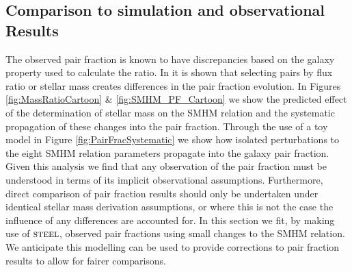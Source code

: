\subsection{Comparison to simulation and observational Results}
\label{subsec:SimObsRes}
The observed pair fraction is known to have discrepancies based on the galaxy property used to calculate the ratio. In \citet{Man2016RESOLVING03} it is shown that selecting pairs by flux ratio or stellar mass creates differences in the pair fraction evolution. 
In Figures \ref{fig:MassRatioCartoon} \& \ref{fig:SMHM_PF_Cartoon} we show the predicted effect of the determination of stellar mass on the SMHM relation and the systematic propagation of these changes into the pair fraction. 
Through the use of a toy model in Figure \ref{fig:PairFracSystematic} we show how isolated perturbations to the eight SMHM relation parameters propagate into the galaxy pair fraction.
Given this analysis we find that any observation of the pair fraction must be understood in terms of its implicit observational assumptions. 
Furthermore, direct comparison of pair fraction results should only be undertaken under identical stellar mass derivation assumptions, or where this is not the case the influence of any differences are accounted for.
In this section we fit, by making use of $\textsc{steel}$, observed pair fractions using small changes to the SMHM relation.
We anticipate this modelling can be used to provide corrections to pair fraction results to allow for fairer comparisons.

